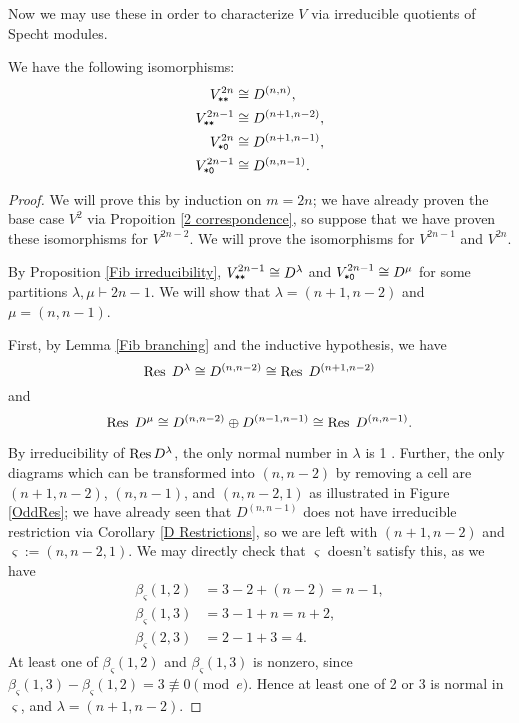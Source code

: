 \documentclass{amsart}
\begin{document}
Now we may use these in order to characterize $V$ via irreducible quotients of Specht modules.
\begin{theorem}\label{Fibonacci Theorem}
  We have the following isomorphisms:
     \begin{align*}  
      V^{2n}_{\texttt{*}\texttt{*}} &\cong D^{(n,n)},\\ 
      V^{2n-1}_{\texttt{*}\texttt{*}} &\cong D^{(n+1,n-2)},\\
      V^{2n}_{\texttt{*}\texttt{0}} &\cong D^{(n+1,n-1)},\\
      V^{2n-1}_{\texttt{*}\texttt{0}} &\cong D^{(n,n-1)}.
     \end{align*}
\end{theorem}
\begin{proof}
  We will prove this by induction on $m = 2n$;
  we have already proven the base case $V^{2}$ via Propoition \ref{2 correspondence}, so suppose that we have proven these isomorphisms for $V^{2n-2}$.
  We will prove the isomorphisms for $V^{2n-1}$ and $V^{2n}$.

  By Proposition \ref{Fib irreducibility}, $V^{2n-1}_{\texttt{*}\texttt{*}} \cong D^{\lambda}$ and $V^{2n-1}_{\texttt{*}\texttt{0}} \cong D^{\mu}$ for some partitions $\lambda,\mu \vdash 2n - 1$.
  We will show that $\lambda = (n+1,n-2)$ and $\mu = (n,n-1)$.
  
  First, by Lemma \ref{Fib branching} and the inductive hypothesis, we have \[\operatorname{Res} \; D^{\lambda} \cong D^{(n,n-2)} \cong \operatorname{Res} \; D^{(n+1,n-2)}\] and \[\operatorname{Res} \; D^{\mu} \cong D^{(n,n-2)} \oplus D^{(n-1,n-1)} \cong \operatorname{Res} \; D^{(n,n-1)}.\]
  
  By irreducibility of $\operatorname{Res} D^{\lambda}$, the only normal number in $\lambda$ is 1 \cite{Kleshchev,Brundan}.
  Further, the only diagrams which can be transformed into $(n,n-2)$ by removing a cell are $(n+1,n-2)$, $(n,n-1)$, and $(n,n-2,1)$ as illustrated in Figure \ref{OddRes};
  we have already seen that $D^{(n,n-1)}$ does not have irreducible restriction via Corollary \ref{D Restrictions}, so we are left with $(n+1,n-2)$ and $\varsigma := (n,n-2,1)$.
  We may directly check that $\varsigma$ doesn't satisfy this, as we have
  \begin{align*} 
    \beta_\varsigma(1,2) &= 3 - 2 + (n-2) = n-1,\\
    \beta_\varsigma(1,3) &= 3 - 1 + n = n+2,\\
    \beta_\varsigma(2,3) &= 2 - 1 + 3 = 4.
   \end{align*} 
  At least one of $\beta_\varsigma(1,2)$ and $\beta_\varsigma(1,3)$ is nonzero, since $\beta_\varsigma(1,3) - \beta_\varsigma(1,2) = 3 \not\equiv 0 \pmod e$.
  Hence at least one of 2 or 3 is normal in $\varsigma$, and $\lambda = (n+1,n-2)$.


\end{proof}
\end{document}
